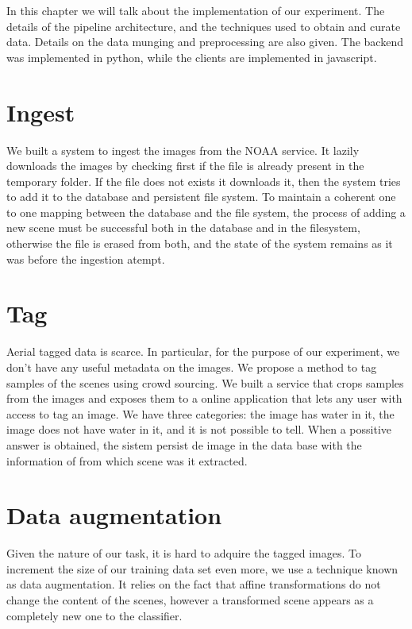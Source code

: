 In this chapter we will talk about the implementation of our experiment. The details of the pipeline architecture, and the techniques used to obtain and curate data. Details on the data munging and preprocessing are also given. The backend was implemented in python, while the clients are implemented in javascript. 

\section{Ingest}

We built a system to ingest the images from the NOAA service. It lazily downloads the images by checking first if the file is already present in the temporary folder. If the file does not exists it downloads it, then the system tries to add it to the database and persistent file system. To maintain a coherent one to one mapping between the database and the file system, the process of adding a new scene must be successful both in the database and in the filesystem, otherwise the file is erased from both, and the state of the system remains as it was before the ingestion atempt.

\section{Tag}

Aerial tagged data is scarce. In particular, for the purpose of our experiment, we don't have any useful metadata on the images. We propose a method to tag samples of the scenes using crowd sourcing. We built a service that crops samples from the images and exposes them to a online application that lets any user with access to tag an image. We have three categories: the image has water in it, the image does not have water in it, and it is not possible to tell. When a possitive answer is obtained, the sistem persist de image in the data base with the information of from which scene was it extracted.

\section{Data augmentation}

Given the nature of our task, it is hard to adquire the tagged images. To increment the size of our training data set even more, we use a technique known as data augmentation. It relies on the fact that affine transformations do not change the content of the scenes, however a transformed scene appears as a completely new one to the classifier. 

